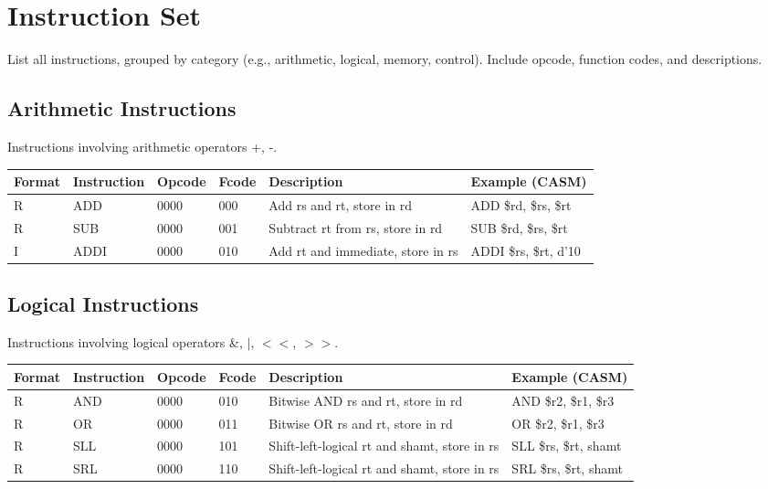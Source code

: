\documentclass[a4paper,11pt]{article}
\begin{document}
	
	\section*{Instruction Set}
	List all instructions, grouped by category (e.g., arithmetic, logical, memory, control). Include opcode, function codes, and descriptions.
	
	\subsection*{Arithmetic Instructions}
	Instructions involving arithmetic operators +, -.
	
	\begin{longtable}{|l|l|l|l|p{6cm}|l|}
		\hline
		\textbf{Format} & \textbf{Instruction} & \textbf{Opcode} & \textbf{Fcode} & \textbf{Description} & \textbf{Example (CASM)}\\
		\hline
		R & ADD                  & 0000         & 000            & Add rs and rt, store in rd & ADD \$rd, \$rs, \$rt \\
		\hline
		R & SUB                  & 0000         & 001            & Subtract rt from rs, store in rd & SUB \$rd, \$rs, \$rt \\
		\hline
		I & ADDI                  & 0000         & 010            & Add rt and immediate, store in rs & ADDI \$rs, \$rt, d'10\\
		\hline
	\end{longtable}
	
	\subsection*{Logical Instructions}
	Instructions involving logical operators \&, $|$, $<<$, $>>$.
	\begin{longtable}{|l|l|l|l|p{6cm}|l|}
		\hline
		\textbf{Format} & \textbf{Instruction} & \textbf{Opcode} & \textbf{Fcode} & \textbf{Description} & \textbf{Example (CASM)} \\
		\hline
		R & AND                  & 0000         & 010            & Bitwise AND rs and rt, store in rd & AND \$r2, \$r1, \$r3\\
		\hline
		R & OR                   & 0000         & 011            & Bitwise OR rs and rt, store in rd & OR \$r2, \$r1, \$r3\\
		\hline
		R & SLL                  & 0000         & 101            & Shift-left-logical rt and shamt, store in rs & SLL \$rs, \$rt, shamt\\
		\hline
		R & SRL                  & 0000         & 110            & Shift-left-logical rt and shamt, store in rs & SRL \$rs, \$rt, shamt \\
		\hline
	\end{longtable}
	
\end{document}
